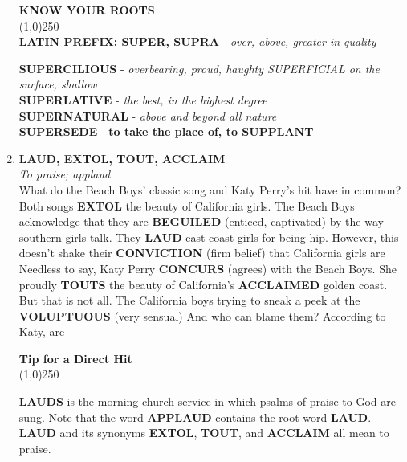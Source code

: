\documentclass{book}
\begin{document}
\begin{enumerate}
\begin{tcolorbox}
\begin{center}
 \textbf{KNOW YOUR ROOTS}\\
\line(1,0){250}\\
 \textbf{ LATIN PREFIX:  SUPER, SUPRA} - \textit{ over, above, greater in quality}
\end{center}
 
 \textbf{SUPERCILIOUS} - \textit{ overbearing, proud, haughty SUPERFICIAL on the surface, shallow }\\
 \textbf{SUPERLATIVE} - \textit{ the best, in the highest degree}\\ \textbf{SUPERNATURAL} - \textit{  above and beyond all nature}\\ \textbf{SUPERSEDE} - \textbf{ to take the place of, to SUPPLANT} 
\end{tcolorbox}  

 \item \textbf{LAUD, EXTOL, TOUT, ACCLAIM}\\
 \textit{  To praise; applaud}\\
 
  What do the Beach Boys' classic song  and Katy Perry's hit  have in common? Both songs \textbf{EXTOL} the beauty of California girls. The Beach Boys acknowledge that they are \textbf{BEGUILED} (enticed, captivated) by the way southern girls talk. They \textbf{LAUD} east coast girls for being hip. However, this doesn't shake their \textbf{CONVICTION} (firm belief) that California girls are  Needless to say, Katy Perry \textbf{CONCURS} (agrees) with the Beach Boys. She proudly \textbf{TOUTS} the beauty of California's \textbf{ACCLAIMED} golden coast. But that is not all. The California boys  trying to sneak a peek at the \textbf{VOLUPTUOUS} (very sensual)  And who can blame them? According to Katy,  are   
  
\begin{tcolorbox}
\begin{center}
 \textbf{Tip for a Direct Hit}\\
\line(1,0){250}\\
\end{center}
   \textbf{LAUDS} is the morning church service in which psalms of praise to God are sung. Note that the word \textbf{APPLAUD} contains the root word \textbf{LAUD}. \textbf{LAUD} and its synonyms \textbf{EXTOL}, \textbf{TOUT}, and \textbf{ACCLAIM} all mean to praise.
\end{tcolorbox}  


\end{enumerate}
\end{document}
